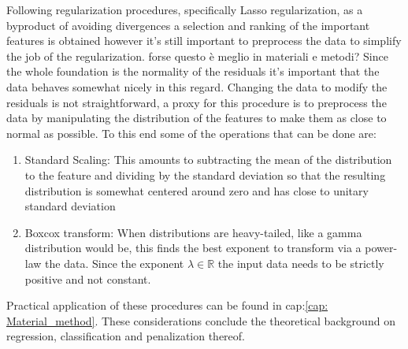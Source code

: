 Following regularization procedures, specifically Lasso regularization, as a byproduct of avoiding divergences a selection and ranking of the important features is obtained however it's still important to preprocess the data to simplify the job of the regularization. \newline
\large{forse questo è meglio in materiali e metodi?} \newline
Since the whole foundation is the normality of the residuals it's important that the data behaves somewhat nicely in this regard. Changing the data to modify the residuals is not straightforward, a proxy for this procedure is to preprocess the data by manipulating the distribution of the features to make them as close to normal as possible.
To this end some of the operations that can be done are:

\begin{enumerate}
\item Standard Scaling: This amounts to subtracting the mean of the distribution to the feature and dividing by the standard deviation so that the resulting distribution is somewhat centered around zero and has close to unitary standard deviation
\item  Boxcox transform: When distributions are heavy-tailed, like a gamma distribution would be, this finds the best exponent to transform via a power-law the data. Since the exponent $\lambda \in$$\mathbb{R}$ the input data needs to be strictly positive and not constant.
\end{enumerate}

Practical application of these procedures can be found in  cap:\ref{cap: Material_method}. These considerations conclude the theoretical background on regression, classification and penalization thereof. 

